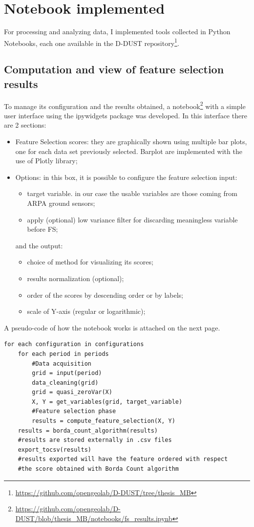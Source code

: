 \section{Notebook implemented}
For processing and analyzing data, I implemented tools collected in Python Notebooks, each one available in the D-DUST repository\footnote{\url{https://github.com/opengeolab/D-DUST/tree/thesis_MB}}.\newline

\subsection{Computation and view of feature selection results}
To manage its configuration and the results obtained, a notebook\footnote{\url{https://github.com/opengeolab/D-DUST/blob/thesis_MB/notebooks/fs_results.ipynb}} with a simple user interface using the ipywidgets package was developed.
In this interface there are 2 sections:
\begin{itemize}
\item Feature Selection scores: they are graphically shown using multiple bar plots, one for each data set previously selected. Barplot are implemented with the use of Plotly library; 
\item Options: in this box, it is possible to configure the feature selection input:
\begin{itemize}
\item target variable. in our case the usable variables are those coming from ARPA ground sensors;
\item apply (optional) low variance filter for discarding meaningless variable before FS;
\end{itemize}
and the output:
\begin{itemize}
\item choice of method for visualizing its scores;
\item results normalization (optional);
\item order of the scores by descending order or by labels;
\item scale of Y-axis (regular or logarithmic);
\end{itemize}
\end{itemize}
A pseudo-code of how the notebook works is attached on the next page.\pagebreak
\begin{verbatim}
for each configuration in configurations
    for each period in periods
        #Data acquisition
        grid = input(period)
        data_cleaning(grid)
        grid = quasi_zeroVar(X)
        X, Y = get_variables(grid, target_variable)
        #Feature selection phase
        results = compute_feature_selection(X, Y)
    results = borda_count_algorithm(results)
    #results are stored externally in .csv files
    export_tocsv(results) 
    #results exported will have the feature ordered with respect
    #the score obtained with Borda Count algorithm
\end{verbatim}
